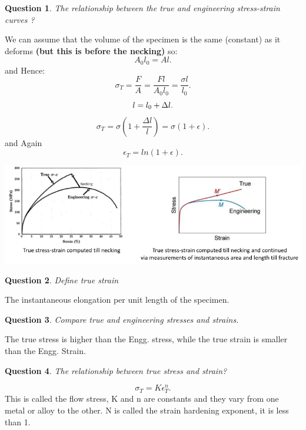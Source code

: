 \documentclass[13]{article}
\newtheorem{exer}{Question}
\begin{document}
\begin{exer}
The relationship between the true and engineering stress-strain curves ?
\end{exer}
We can assume that the volume of the specimen is the same (constant) as it deforms \textbf{(but this is before the necking)}  so:
\[
A_0l_0 = Al
.\] 
and Hence:
\[
\sigma_T = \frac{F}{A} = \frac{Fl}{A_0l_0} = \frac{\sigma l}{l_0}
.\] 
\[
l = l_0+\Delta l \\ 
.\] 
\[
\sigma_T = \sigma (1+\frac{\Delta l}{l}) = \sigma (1+ \epsilon)
.\]
and Again
\[
	\epsilon_T = ln(1+ \epsilon)
.\] 
\begin{center}
\includegraphics[scale=0.5]{figures/8.png}
\end{center}
\begin{exer}
Define true strain
\end{exer}
The instantaneous elongation per unit length of the specimen.
\begin{exer}
Compare true and engineering stresses and strains.
\end{exer}
The true stress is higher than the Engg. stress, while the true strain is smaller than the Engg. Strain.
\begin{exer}
The relationship between true stress and strain?
\end{exer}
\[
\sigma_T = K \epsilon_T^n
.\] 
This is called the flow stress, K and n are constants and they vary from one metal or alloy to the other. N is called the strain hardening exponent, it is less than 1. 
\end{document}
